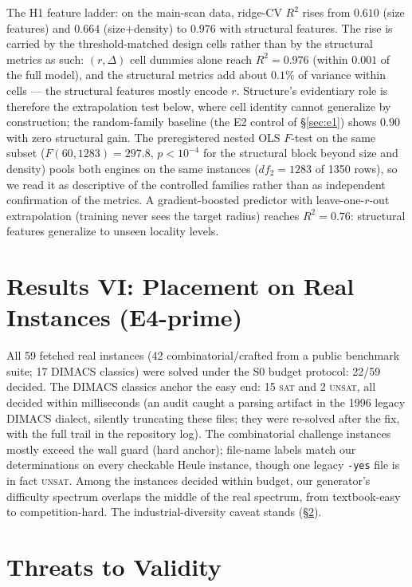 \documentclass[pdflatex,sn-basic,Numbered]{sn-jnl}
\begin{document}
The H1 feature ladder: on the main-scan data, ridge-CV $R^2$ rises from
$0.610$ (size features) and $0.664$ (size+density) to $\mathbf{0.976}$ with
structural features. The rise is carried by the threshold-matched design
cells rather than by the structural metrics as such: $(r,\Delta)$ cell
dummies alone reach $R^2=0.976$ (within $0.001$ of the full model), and the
structural metrics add about $0.1\%$ of variance within cells --- the
structural features mostly encode $r$. Structure's evidentiary role is
therefore the extrapolation test below, where cell identity cannot
generalize by construction; the random-family baseline (the E2 control of
\S\ref{sec:e1}) shows $0.90$ with zero structural gain. The preregistered
nested OLS $F$-test on the same subset ($F(60,1283)=297.8$, $p<10^{-4}$ for
the structural block beyond size and density) pools both engines on the same
instances ($df_2=1283$ of 1350 rows), so we read it as descriptive of the
controlled families rather than as independent confirmation of the metrics.
A gradient-boosted predictor with leave-one-$r$-out extrapolation (training
never sees the target radius) reaches $R^2 = 0.76$: structural features
generalize to unseen locality levels.

\section{Results VI: Placement on Real Instances (E4-prime)}
\label{sec:e4}

All 59 fetched real instances (42 combinatorial/crafted from a public
benchmark suite; 17 DIMACS classics) were solved under the S0 budget protocol:
22/59 decided. The DIMACS classics anchor the easy end: 15 \textsc{sat} and 2
\textsc{unsat}, all decided within milliseconds (an audit caught a parsing
artifact in the 1996 legacy DIMACS dialect, silently truncating these files;
they were re-solved after the fix, with the full trail in the repository log).
The combinatorial challenge instances mostly exceed the wall guard (hard
anchor); file-name labels match our determinations on every checkable Heule
instance, though one legacy \texttt{-yes} file is in fact \textsc{unsat}. Among
the instances decided within budget, our
generator's difficulty spectrum overlaps the middle of the real spectrum, from
textbook-easy to competition-hard. The industrial-diversity caveat stands
(\S\ref{sec:threats}).

\section{Threats to Validity}
\label{sec:threats}
\end{document}
